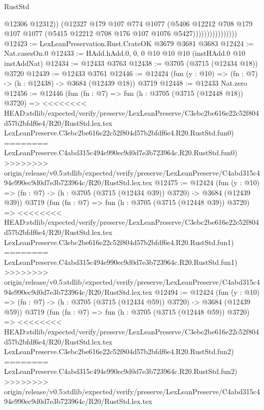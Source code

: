 \begin{lexlean}{RustStd}
\begin{coremodule}
{\begin{coremodule}
{{{{{{{{{{{{{{                                  @12306
                                  @12312))
                              (@12327
                                @179
                                @107
                                @774
                                @1077
                                (@5406
                                  @12212
                                  @708
                                  @179
                                  @107
                                  @1077
                                  (@5415 @12212 @708 @176 @107 @1076 @5427))))))))))))))))
@12423 := LexLeanPreservation.Rust.CrateOK @3679 @3681 @3683
@12424 := Nat.casesOn.{0}
@12433 := HAdd.hAdd.{0, 0, 0} @10 @10 @10 (instHAdd.{0} @10 instAddNat)
@12434 := @12433 @3763
@12438 := @3705 (@3715 (@12434 @18)) @3720
@12439 := @12433 @3761
@12446 := @12424 (fun (y : @10) => (fn : @7) -> (h : @12438) -> @3684 (@12439 @18)) @3719
@12448 := @12433 Nat.zero
@12456 := @12446
    (fun (fn : @7) =>
    fun (h : @3705 (@3715 (@12448 @18)) @3720) =>
<<<<<<<< HEAD:stdlib/expected/verify/preserve/LexLeanPreserve/C3ebc2be616e22c52f804d57b2bfdf6e4/R20/RustStd.lex.tex
    LexLeanPreserve.C3ebc2be616e22c52f804d57b2bfdf6e4.R20.RustStd.fun0)
========
    LexLeanPreserve.C4abd315c494e990ec9d0d7e3b723964c.R20.RustStd.fun0)
>>>>>>>> origin/release/v0.5:stdlib/expected/verify/preserve/LexLeanPreserve/C4abd315c494e990ec9d0d7e3b723964c/R20/RustStd.lex.tex
@12475 := @12424
    (fun (y : @10) => (fn : @7) -> (h : @3705 (@3715 (@12434 @39)) @3720) -> @3684 (@12439 @39))
    @3719
    (fun (fn : @7) =>
    fun (h : @3705 (@3715 (@12448 @39)) @3720) =>
<<<<<<<< HEAD:stdlib/expected/verify/preserve/LexLeanPreserve/C3ebc2be616e22c52f804d57b2bfdf6e4/R20/RustStd.lex.tex
    LexLeanPreserve.C3ebc2be616e22c52f804d57b2bfdf6e4.R20.RustStd.fun1)
========
    LexLeanPreserve.C4abd315c494e990ec9d0d7e3b723964c.R20.RustStd.fun1)
>>>>>>>> origin/release/v0.5:stdlib/expected/verify/preserve/LexLeanPreserve/C4abd315c494e990ec9d0d7e3b723964c/R20/RustStd.lex.tex
@12494 := @12424
    (fun (y : @10) => (fn : @7) -> (h : @3705 (@3715 (@12434 @59)) @3720) -> @3684 (@12439 @59))
    @3719
    (fun (fn : @7) =>
    fun (h : @3705 (@3715 (@12448 @59)) @3720) =>
<<<<<<<< HEAD:stdlib/expected/verify/preserve/LexLeanPreserve/C3ebc2be616e22c52f804d57b2bfdf6e4/R20/RustStd.lex.tex
    LexLeanPreserve.C3ebc2be616e22c52f804d57b2bfdf6e4.R20.RustStd.fun2)
========
    LexLeanPreserve.C4abd315c494e990ec9d0d7e3b723964c.R20.RustStd.fun2)
>>>>>>>> origin/release/v0.5:stdlib/expected/verify/preserve/LexLeanPreserve/C4abd315c494e990ec9d0d7e3b723964c/R20/RustStd.lex.tex
}}}}}}}}}}}}}}
\end{coremodule}}
\end{coremodule}
\end{lexlean}
